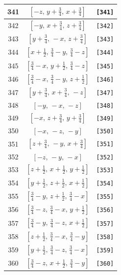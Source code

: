 \documentclass[fleqn,8pt]{jsarticle}
\begin{document}
\begin{longtable}{ccc}
341 & $\left[ - z,\, y + \frac{3}{4},\, x + \frac{3}{4} \right]$ & {\tt [341]} \\ \hline
342 & $\left[ - y,\, x + \frac{3}{4},\, z + \frac{3}{4} \right]$ & {\tt [342]} \\ \hline
343 & $\left[ y + \frac{3}{4},\, - x,\, z + \frac{3}{4} \right]$ & {\tt [343]} \\ \hline
344 & $\left[ x + \frac{1}{2},\, \frac{3}{4} - y,\, \frac{3}{4} - z \right]$ & {\tt [344]} \\ \hline
345 & $\left[ \frac{3}{4} - x,\, y + \frac{1}{2},\, \frac{3}{4} - z \right]$ & {\tt [345]} \\ \hline
346 & $\left[ \frac{3}{4} - x,\, \frac{3}{4} - y,\, z + \frac{1}{2} \right]$ & {\tt [346]} \\ \hline
347 & $\left[ y + \frac{3}{4},\, x + \frac{3}{4},\, - z \right]$ & {\tt [347]} \\ \hline
348 & $\left[ - y,\, - x,\, - z \right]$ & {\tt [348]} \\ \hline
349 & $\left[ - x,\, z + \frac{3}{4},\, y + \frac{3}{4} \right]$ & {\tt [349]} \\ \hline
350 & $\left[ - x,\, - z,\, - y \right]$ & {\tt [350]} \\ \hline
351 & $\left[ z + \frac{3}{4},\, - y,\, x + \frac{3}{4} \right]$ & {\tt [351]} \\ \hline
352 & $\left[ - z,\, - y,\, - x \right]$ & {\tt [352]} \\ \hline
353 & $\left[ z + \frac{1}{2},\, x + \frac{1}{2},\, y + \frac{1}{2} \right]$ & {\tt [353]} \\ \hline
354 & $\left[ y + \frac{1}{2},\, z + \frac{1}{2},\, x + \frac{1}{2} \right]$ & {\tt [354]} \\ \hline
355 & $\left[ \frac{3}{4} - y,\, z + \frac{1}{2},\, \frac{3}{4} - x \right]$ & {\tt [355]} \\ \hline
356 & $\left[ \frac{3}{4} - z,\, \frac{3}{4} - x,\, y + \frac{1}{2} \right]$ & {\tt [356]} \\ \hline
357 & $\left[ \frac{3}{4} - y,\, \frac{3}{4} - z,\, x + \frac{1}{2} \right]$ & {\tt [357]} \\ \hline
358 & $\left[ z + \frac{1}{2},\, \frac{3}{4} - x,\, \frac{3}{4} - y \right]$ & {\tt [358]} \\ \hline
359 & $\left[ y + \frac{1}{2},\, \frac{3}{4} - z,\, \frac{3}{4} - x \right]$ & {\tt [359]} \\ \hline
360 & $\left[ \frac{3}{4} - z,\, x + \frac{1}{2},\, \frac{3}{4} - y \right]$ & {\tt [360]} \\ \hline

\end{longtable}
\end{document}
